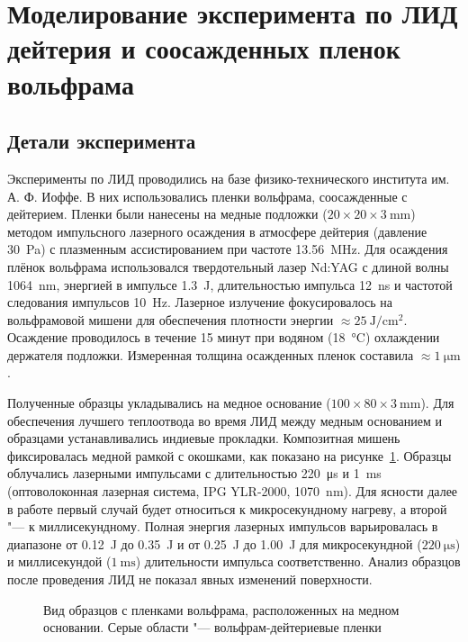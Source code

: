 \section{Моделирование эксперимента по ЛИД дейтерия и соосажденных пленок вольфрама}\label{sec:ch4/sec1}

\subsection{Детали эксперимента}\label{subsec:ch4/sec1/subsec1}

Эксперименты по ЛИД проводились на базе физико-технического института им. А. Ф. Иоффе. В них использовались пленки вольфрама, соосажденные с дейтерием. Пленки были нанесены на медные подложки ($20 \times 20 \times \SI{3}{\milli\metre}$) методом импульсного лазерного осаждения в атмосфере дейтерия (давление \SI{30}{\pascal}) с плазменным ассистированием при частоте \SI{13.56}{\mega\hertz}. Для осаждения плёнок вольфрама использовался твердотельный лазер Nd:YAG с длиной волны \SI{1064}{\nano\meter}, энергией в импульсе \SI{1.3}{\joule}, длительностью импульса \SI{12}{\nano\second} и частотой следования импульсов \SI{10}{\hertz}. Лазерное излучение фокусировалось на вольфрамовой мишени для обеспечения плотности энергии $\approx\SI{25}{\joule\per\centi\meter\squared}$. Осаждение проводилось в течение 15 минут при водяном (\SI{18}{\degreeCelsius}) охлаждении держателя подложки. Измеренная толщина осажденных пленок составила $\approx\SI{1}{\micro\metre}$.

Полученные образцы укладывались на медное основание ($100 \times 80 \times \SI{3}{\milli\metre}$). Для обеспечения лучшего теплоотвода во время ЛИД между медным основанием и образцами устанавливались индиевые прокладки. Композитная мишень фиксировалась медной рамкой с окошками, как показано на рисунке~\cref{fig:ch4/LID_target}. Образцы облучались лазерными импульсами с длительностью \SI{220}{\micro\second} и \SI{1}{\milli\second} (оптоволоконная лазерная система, IPG YLR-2000, \SI{1070}{\nano\metre}). Для ясности далее в работе первый случай будет относиться к микросекундному нагреву, а второй "--- к миллисекундному. Полная энергия лазерных импульсов варьировалась в диапазоне от \SI{0.12}{\joule} до \SI{0.35}{\joule} и от \SI{0.25}{\joule} до \SI{1.00}{\joule} для микросекундной (\( \SI{220}{\micro\second} \)) и миллисекундой (\(\SI{1}{\milli\second}\)) длительности импульса соответственно. Анализ образцов после проведения ЛИД не показал явных изменений поверхности.

\begin{figure}[ht]
    \caption{Вид образцов с пленками вольфрама, расположенных на медном основании. Серые области "--- вольфрам-дейтериевые пленки}\label{fig:ch4/LID_target}
\end{figure}

